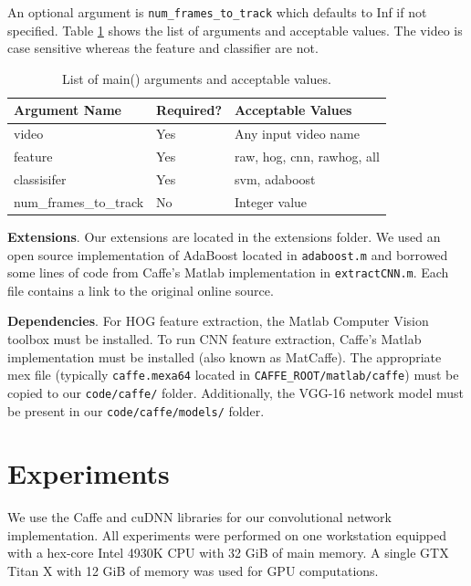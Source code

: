 \documentclass[10pt,twocolumn,letterpaper]{article}
\begin{document}
\noindent An optional argument is \texttt{num\_frames\_to\_track} which defaults to Inf if not specified. Table \ref{table:arguments} shows the list of arguments and acceptable values. The video is case sensitive whereas the feature and classifier are not.
\begin{table}[h]
\centering
\caption{List of main() arguments and acceptable values.}
\small
\begin{tabular}{lll}
 \hline
 Argument Name & Required? & Acceptable Values \\ \hline
 video & Yes & Any input video name \\ 
 feature & Yes & raw, hog, cnn, rawhog, all \\
 classisifer & Yes & svm, adaboost \\
 num\_frames\_to\_track & No & Integer value \\ \hline
\end{tabular}
\label{table:arguments}
\end{table}

\textbf{Extensions}. Our extensions are located in the extensions folder. We used an open source implementation of AdaBoost located in \texttt{adaboost.m} and borrowed some lines of code from Caffe's Matlab implementation in \texttt{extractCNN.m}. Each file contains a link to the original online source.

\textbf{Dependencies}. For HOG feature extraction, the Matlab Computer Vision toolbox must be installed. To run CNN feature extraction, Caffe's Matlab implementation must be installed (also known as MatCaffe). The appropriate mex file (typically \texttt{caffe.mexa64} located in \texttt{CAFFE\_ROOT/matlab/caffe}) must be copied to our \texttt{code/caffe/} folder. Additionally, the VGG-16 network model must be present in our \texttt{code/caffe/models/} folder.

\section{Experiments}\label{sec:experiments}


We use the Caffe \cite{jia2014caffe} and cuDNN \cite{chetlur2014cudnn} libraries for our convolutional network implementation. All experiments were performed on one workstation equipped with a hex-core Intel 4930K CPU with 32 GiB of main memory. A single GTX Titan X with 12 GiB of memory was used for GPU computations.
\end{document}
